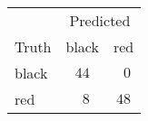\begin{tabular}{lcc}
\hline
 & \multicolumn{2}{c}{Predicted} \\ 
Truth  & black & \multicolumn{1}{c}{red} \\ 
\hline
black  & $44$ & $\phantom{0}0$ \\
red  & $\phantom{0}8$ & $48$ \\
\hline 
\end{tabular}
